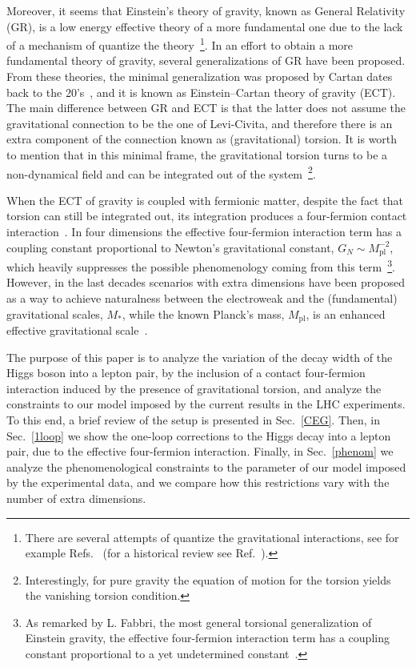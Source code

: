 \documentclass[twocolumn,aps,prd,showkeys,showpacs,groupedaddress]{revtex4-1}
\begin{document}
Moreover, it seems that Einstein's theory of gravity, known as General Relativity (GR), is a low energy effective theory of a more fundamental one due to the lack of a mechanism of quantize the theory~\footnote{There are several attempts of quantize the gravitational interactions, see for example Refs.~\cite{Ashtekar:1986yd,*Ashtekar:1987gu,*Ashtekar:2004eh,DeWitt:1967yk,*DeWitt:1967ub,*DeWitt:1967uc} (for a historical review see Ref.~\cite{Rovelli:2000aw}).}. In an effort to obtain a more fundamental theory of gravity, several generalizations of GR have been proposed. From these theories, the minimal generalization was proposed by Cartan dates back to the 20's~\cite{Cartan-Einstein,Cartan1922,*Cartan1923,*Cartan1924,*Cartan1925}, and it is known as Einstein--Cartan theory of gravity (ECT). The main difference between GR and ECT is that the latter does not assume the gravitational connection to be the one of Levi-Civita, and therefore there is an extra component of the connection known as (gravitational) torsion. It is worth to mention that in this minimal frame, the gravitational torsion turns to be a non-dynamical field and can be integrated out of the system~\footnote{Interestingly, for pure gravity the equation of motion for the torsion yields the vanishing torsion condition.}.

When the ECT of gravity is coupled with fermionic matter, despite the fact that torsion can still be integrated out, its integration produces a four-fermion contact interaction~\cite{Kibble:1961ba,RevModPhys.48.393,Shapiro:2001rz,SUGRA-book,Castillo-Felisola:2013jva}. In four dimensions the effective four-fermion interaction term has a coupling constant proportional to Newton's gravitational constant, $G_N\sim M_{\text{pl}}^{-2}$, which heavily suppresses the possible phenomenology coming from this term~\footnote{As remarked by L. Fabbri, the most general torsional generalization of Einstein gravity, the effective four-fermion interaction term has a coupling constant proportional to a yet undetermined constant~\cite{Fabbri:2011kq}.}. However, in the last decades scenarios with extra dimensions have been proposed as a way to achieve naturalness between the electroweak and the (fundamental) gravitational scales, $M_*$, while the known Planck's mass, $M_{\text{pl}}$, is an enhanced effective gravitational scale~\cite{ADD1,*AADD,*ADD2,RS1,*RS2}.

The purpose of this paper is to analyze the variation of the decay width of the Higgs boson into a lepton pair, by the inclusion of a contact four-fermion interaction induced by the presence of gravitational torsion, and analyze the constraints to our model imposed by the current results in the LHC experiments. To this end, a brief review of the setup is presented in Sec.~\ref{CEG}. Then, in Sec.~\ref{1loop} we show the one-loop corrections to the Higgs decay into a lepton pair, due to the effective four-fermion interaction. Finally, in Sec.~\ref{phenom} we analyze the phenomenological constraints to the parameter of our model imposed by the experimental data, and we compare how this restrictions vary with the number of extra dimensions.
\end{document}
